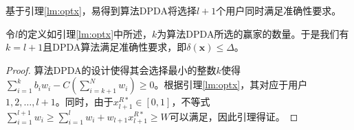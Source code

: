 	基于引理\ref{lm:optx}，易得到算法DPDA将选择$l+1$个用户同时满足准确性要求。
	
	\begin{lm}\label{lm:k}
		令$l$的定义如引理\ref{lm:optx}中所述，$k$为算法DPDA所选的赢家的数量。于是我们有$k=l+1$且DPDA算法满足准确性要求，即$\delta(\mathbf{x})\le \Delta$。
	\end{lm}
	\begin{proof}
		算法DPDA的设计使得其会选择最小的整数$k$使得$\sum_{i=1}^{k}b_iw_i-C(\sum_{i=k+1}^{N}w_i)\ge 0$。根据引理\ref{lm:optx}，其对应于用户$1, 2,\dots,l+1$。同时，由于$x_{l+1}^{R*}\in[0,1]$，不等式$\sum_{i=1}^{l+1}w_i\ge\sum_{i=1}^{l}w_i+w_{l+1}x_{l+1}^{R*}\ge W$可以满足，因此引理得证。
	\end{proof}
	
